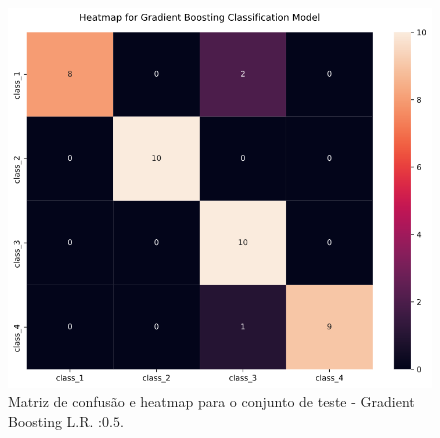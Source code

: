 \documentclass[
	article,			%
	11pt,				%
	oneside,			%
	a4paper,			%
	english,			%
	brazil,				%
	sumario=tradicional
	]{abntex2}
\begin{document}
\begin{figure}[h!]
 \centering
 \includegraphics[scale=0.5]{fig/gb_cm.png}
 \caption{Matriz de confusão e heatmap para o conjunto de teste - Gradient Boosting L.R. :$0.5$.}
 \label{fig:gb_cm}
\end{figure}
\end{document}

